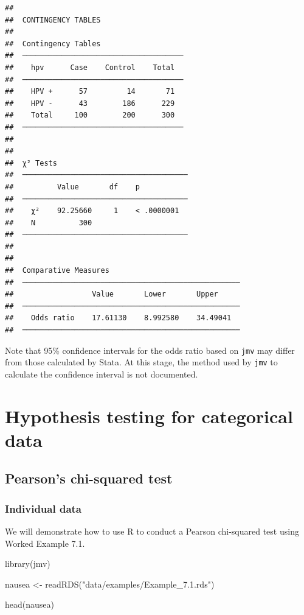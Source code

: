 \documentclass[
]{memoir}
\newenvironment{Shaded}{\begin{snugshade}}{\end{snugshade}}
\newcommand{\FunctionTok}[1]{\textcolor[rgb]{0.00,0.00,0.00}{#1}}
\newcommand{\NormalTok}[1]{#1}
\newcommand{\OtherTok}[1]{\textcolor[rgb]{0.56,0.35,0.01}{#1}}
\newcommand{\StringTok}[1]{\textcolor[rgb]{0.31,0.60,0.02}{#1}}
\begin{document}
\begin{verbatim}
## 
##  CONTINGENCY TABLES
## 
##  Contingency Tables                    
##  ───────────────────────────────────── 
##    hpv      Case    Control    Total   
##  ───────────────────────────────────── 
##    HPV +      57         14       71   
##    HPV -      43        186      229   
##    Total     100        200      300   
##  ───────────────────────────────────── 
## 
## 
##  χ² Tests                               
##  ────────────────────────────────────── 
##          Value       df    p            
##  ────────────────────────────────────── 
##    χ²    92.25660     1    < .0000001   
##    N          300                       
##  ────────────────────────────────────── 
## 
## 
##  Comparative Measures                               
##  ────────────────────────────────────────────────── 
##                  Value       Lower       Upper      
##  ────────────────────────────────────────────────── 
##    Odds ratio    17.61130    8.992580    34.49041   
##  ──────────────────────────────────────────────────
\end{verbatim}

Note that 95\% confidence intervals for the odds ratio based on \texttt{jmv} may differ from those calculated by Stata. At this stage, the method used by \texttt{jmv} to calculate the confidence interval is not documented.

\hypertarget{hypothesis-testing-for-categorical-data}{%
\chapter{Hypothesis testing for categorical data}\label{hypothesis-testing-for-categorical-data}}

\hypertarget{pearsons-chi-squared-test}{%
\section{Pearson's chi-squared test}\label{pearsons-chi-squared-test}}

\hypertarget{individual-data-1}{%
\subsection{Individual data}\label{individual-data-1}}

We will demonstrate how to use R to conduct a Pearson chi-squared test using Worked Example 7.1.

\begin{Shaded}
\begin{Highlighting}[]
\FunctionTok{library}\NormalTok{(jmv)}

\NormalTok{nausea }\OtherTok{\textless{}{-}} \FunctionTok{readRDS}\NormalTok{(}\StringTok{"data/examples/Example\_7.1.rds"}\NormalTok{)}

\FunctionTok{head}\NormalTok{(nausea)}
\end{Highlighting}
\end{Shaded}
\end{document}
